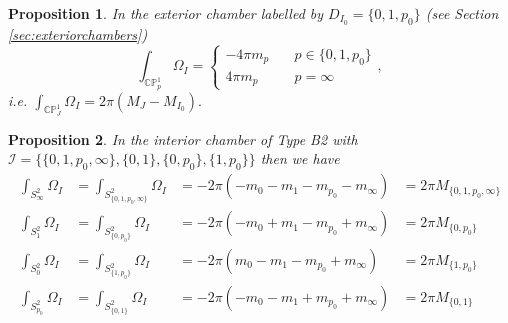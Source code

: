 \documentclass[10pt,a4paper]{amsart}
\newtheorem{prop}{Proposition}
\newcommand{\CP}{\ensuremath{\mathbb {CP}}}
\begin{document}
\begin{prop}\label{prop:exteriorintersection}
In the exterior chamber labelled by $D_{I_0} = \{0, 1, p_0\}$ (see Section \ref{sec:exteriorchambers}) 
  \[\int_{\CP^1_p} \Omega_I = \begin{cases} -4 \pi  m_p &\quad p \in \{0, 1, p_0\}\\
  4 \pi  m_p & \quad p=\infty\end{cases},  \]
  i.e. $\int_{\CP^1_J} \Omega_I = 2 \pi (M_J -M_{I_0}).$
 \end{prop}

\begin{prop}\label{prop:interiorintersection} 
In the interior chamber of Type B2 with $\mathcal{I}=\{\{0, 1, p_0, \infty\}, \{0, 1\}, \{0, p_0\}, \{1, p_0\}\}$ then we have  
\begin{equation}
\begin{array}{llll}
\int_{S^2_\infty} \Omega_I &=\int_{S^2_{\{0, 1, p_0, \infty \}}} \Omega_I &= -2 \pi (-m_0 - m_1 - m_{p_0}- m_\infty)&=2 \pi M_{\{0, 1, p_0, \infty\}}\\
\int_{S^2_1}  \Omega_I&= \int_{S^2_{\{0, p_0\}}} \Omega_I &= -2 \pi (-m_0 +m_1 - m_{p_0}+ m_\infty)&=2 \pi M_{\{0,p_0\}}\\
\int_{S^2_0}  \Omega_I&=\int_{S^2_{\{1, p_0\}}} \Omega_I &= -2\pi (m_0 -m_1 - m_{p_0}+ m_\infty)&=2 \pi M_{\{1,p_0\}}\\
\int_{S^2_{p_0}}  \Omega_I&=\int_{S^2_{\{0, 1\}}} \Omega_I &= -2 \pi (-m_0 -m_1 + m_{p_0}+ m_\infty)&= 2 \pi M_{\{0,1\}}
\end{array}
\end{equation}
\end{prop}
\end{document}
